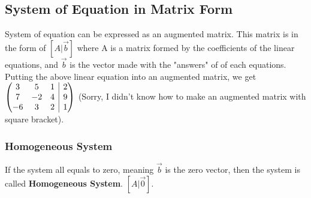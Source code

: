 \documentclass[12pt]{article}
\makeatletter
\newenvironment{amatrix}[1]{%
  \left(\begin{array}{@{}*{#1}{c}|c@{}}
}{%
  \end{array}\right)
}
\makeatother
\begin{document}
\subsection{System of Equation in Matrix Form}
System of equation can be expressed as an augmented matrix. This matrix is in the form of $[A|\vec{b}]$ where A is a matrix formed by the coefficients of the linear equations, and $\vec{b}$ is the vector made with the "answers" of of each equations. 
Putting the above linear equation into an augmented matrix, we get 
$
\begin{amatrix}{3}
   3 & 5 & 1 &2 \\ 7 & -2 &4 &9\\-6&3&2&1\\ 
 \end{amatrix}
$
(Sorry, I didn't know how to make an augmented matrix with square bracket).\\
\subsubsection{Homogeneous System}
If the system all equals to zero, meaning $\vec{b}$ is the zero vector, then the system is called \textbf{Homogeneous System}. $[A|\vec{0}]$.
\end{document}
